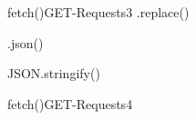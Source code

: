 fetch()GET-Requests3
    .replace()

    .json()

    JSON.stringify()
    
fetch()GET-Requests4
    